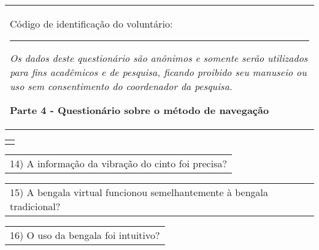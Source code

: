 \begin{table}[!thb]
    \begin{tabular}{m{1\linewidth}}

        {\color{gray}
        
        Código de identificação do voluntário: \rule{1in}{.2mm}
        
        \textit{Os dados deste questionário são anônimos e somente serão utilizados para fins acadêmicos e de pesquisa, ficando proibido seu manuseio ou uso sem consentimento do coordenador da pesquisa.}
        }
        
        \begin{center}
        \textbf{Parte 4 - Questionário sobre o método de navegação}
        \end{center}
        
    \end{tabular}
%
    \begin{tabular}{>{\centering\arraybackslash}m{1\linewidth}}
        {\large TESTE 3 - BENGALA VIRTUAL}
    \end{tabular}


    \begin{tabular}{m{1\linewidth}}
        \vspace{2ex}
        14)	A informação da vibração do cinto foi precisa?
    \end{tabular}

    
    

    \begin{tabular}{m{1\linewidth}}
        \vspace{2ex}
        15)	A bengala virtual funcionou semelhantemente à bengala tradicional?
    \end{tabular}

    
    

    \begin{tabular}{m{1\linewidth}}
        \vspace{2ex}
        16)	O uso da bengala foi intuitivo?
    \end{tabular}

    
    


\end{table}
